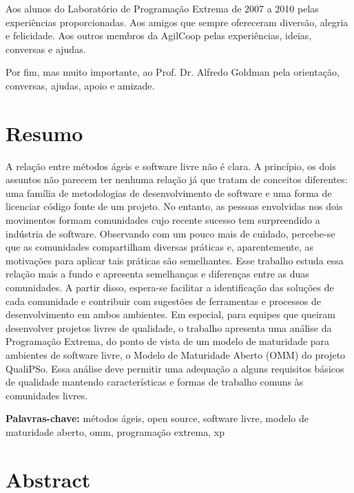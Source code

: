 \documentclass[11pt,twoside,a4paper]{book}
\begin{document}
Aos alunos do Laboratório de Programação Extrema de 2007 a 2010 pelas
experiências proporcionadas. Aos amigos que sempre ofereceram
diversão, alegria e felicidade.  Aos outros membros da AgilCoop pelas
experiências, ideias, conversas e ajudas.

Por fim, mas muito importante, ao Prof. Dr. Alfredo Goldman pela
orientação, conversas, ajudas, apoio e amizade.

\chapter*{Resumo}

A relação entre métodos ágeis e software livre não é clara. A
princípio, os dois assuntos não parecem ter nenhuma relação já que
tratam de conceitos diferentes: uma família de metodologias de
desenvolvimento de software e uma forma de licenciar código fonte de
um projeto. No entanto, as pessoas envolvidas nos dois movimentos
formam comunidades cujo recente sucesso tem surpreendido a indústria
de software. Observando com um pouco mais de cuidado, percebe-se que
as comunidades compartilham diversas práticas e, aparentemente, as
motivações para aplicar tais práticas são semelhantes. Esse trabalho
estuda essa relação mais a fundo e apresenta semelhanças e diferenças
entre as duas comunidades. A partir disso, espera-se facilitar a
identificação das soluções de cada comunidade e contribuir com
sugestões de ferramentas e processos de desenvolvimento em ambos
ambientes. Em especial, para equipes que queiram desenvolver projetos
livres de qualidade, o trabalho apresenta uma análise da Programação
Extrema, do ponto de vista de um modelo de maturidade para ambientes
de software livre, o Modelo de Maturidade Aberto (OMM) do projeto
QualiPSo. Essa análise deve permitir uma adequação a alguns requisitos
básicos de qualidade mantendo características e formas de trabalho
comuns às comunidades livres.

\noindent \textbf{Palavras-chave:} métodos ágeis, open source,
software livre, modelo de maturidade aberto, omm, programação extrema,
xp

\chapter*{Abstract}
\end{document}
